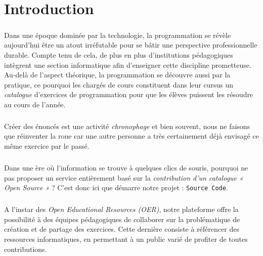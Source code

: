\chapter{Introduction}

\paragraph{} Dans une époque dominée par la technologie, la programmation se révèle aujourd’hui être un atout irréfutable pour se bâtir une perspective professionnelle durable. Compte tenu de cela, de plus en plus d’institutions pédagogiques intègrent une section informatique afin d’enseigner cette discipline prometteuse. Au-delà de l’aspect théorique, la programmation se découvre aussi par la pratique, ce pourquoi les chargés de cours constituent dans leur cursus un \textit{catalogue} d’exercices de programmation pour que les élèves puissent les résoudre au cours de l'année. 

\paragraph{} Créer des énoncés est une activité \textit{chronophage} et bien souvent, nous ne faisons que réinventer la roue car une autre personne a très certainement déjà envisagé ce même exercice par le passé.

\paragraph{} Dans une ère où l’information se trouve à quelques clics de souris, pourquoi ne pas proposer un service entièrement basé sur la \textit{contribution d’un catalogue « Open Source »} ? C’est donc ici que démarre notre projet : \texttt{Source Code}.

\paragraph{} A l’instar des \textit{Open Educational Resources (OER)}, notre plateforme offre la possibilité à des équipes pédagogiques de collaborer sur la problématique de création et de partage des exercices. Cette dernière consiste à référencer des ressources informatiques, en permettant à un public varié de profiter de toutes contributions. 